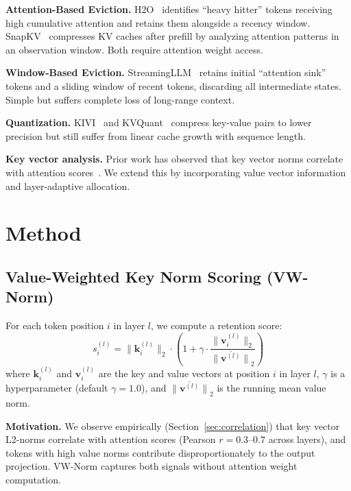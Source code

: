 \documentclass{article}
\begin{document}
\textbf{Attention-Based Eviction.} H2O~\cite{zhang2023h2o} identifies ``heavy hitter'' tokens receiving high cumulative attention and retains them alongside a recency window. SnapKV~\cite{li2024snapkv} compresses KV caches after prefill by analyzing attention patterns in an observation window. Both require attention weight access.

\textbf{Window-Based Eviction.} StreamingLLM~\cite{xiao2023streaming} retains initial ``attention sink'' tokens and a sliding window of recent tokens, discarding all intermediate states. Simple but suffers complete loss of long-range context.

\textbf{Quantization.} KIVI~\cite{liu2024kivi} and KVQuant~\cite{hooper2024kvquant} compress key-value pairs to lower precision but still suffer from linear cache growth with sequence length.

\textbf{Key vector analysis.} Prior work has observed that key vector norms correlate with attention scores~\cite{sun2024massive}. We extend this by incorporating value vector information and layer-adaptive allocation.

\section{Method}

\subsection{Value-Weighted Key Norm Scoring (VW-Norm)}

For each token position $i$ in layer $l$, we compute a retention score:
\begin{equation}
    s_i^{(l)} = \|\mathbf{k}_i^{(l)}\|_2 \cdot \left(1 + \gamma \cdot \frac{\|\mathbf{v}_i^{(l)}\|_2}{\overline{\|\mathbf{v}^{(l)}\|}_2}\right)
\end{equation}
where $\mathbf{k}_i^{(l)}$ and $\mathbf{v}_i^{(l)}$ are the key and value vectors at position $i$ in layer $l$, $\gamma$ is a hyperparameter (default $\gamma = 1.0$), and $\overline{\|\mathbf{v}^{(l)}\|}_2$ is the running mean value norm.

\textbf{Motivation.} We observe empirically (Section~\ref{sec:correlation}) that key vector L2-norms correlate with attention scores (Pearson $r = 0.3$--$0.7$ across layers), and tokens with high value norms contribute disproportionately to the output projection. VW-Norm captures both signals without attention weight computation.
\end{document}
